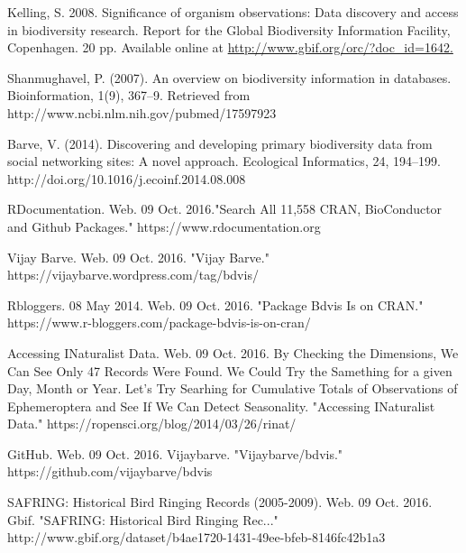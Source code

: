 
\begin{thebibliography}{99}

Kelling, S. 2008. Significance of organism observations: Data discovery and access in biodiversity research. Report for the Global Biodiversity Information Facility, Copenhagen. 20 pp. Available online at \url{http://www.gbif.org/orc/?doc_id=1642.}

Shanmughavel, P. (2007). An overview on biodiversity information in databases. Bioinformation, 1(9), 367–9. Retrieved from http://www.ncbi.nlm.nih.gov/pubmed/17597923

Barve, V. (2014). Discovering and developing primary biodiversity data from social networking sites: A novel approach. Ecological Informatics, 24, 194–199. http://doi.org/10.1016/j.ecoinf.2014.08.008

RDocumentation. Web. 09 Oct. 2016."Search All 11,558 CRAN, BioConductor and Github Packages." https://www.rdocumentation.org

Vijay Barve. Web. 09 Oct. 2016. "Vijay Barve." https://vijaybarve.wordpress.com/tag/bdvis/

Rbloggers. 08 May 2014. Web. 09 Oct. 2016. "Package Bdvis Is on CRAN." https://www.r-bloggers.com/package-bdvis-is-on-cran/

Accessing INaturalist Data. Web. 09 Oct. 2016. By Checking the Dimensions, We Can See Only 47 Records Were Found. We Could Try the Samething for a given Day, Month or Year. Let's Try Searhing for Cumulative Totals of Observations of Ephemeroptera and See If We Can Detect Seasonality. "Accessing INaturalist Data."  https://ropensci.org/blog/2014/03/26/rinat/

GitHub. Web. 09 Oct. 2016. Vijaybarve. "Vijaybarve/bdvis." https://github.com/vijaybarve/bdvis

SAFRING: Historical Bird Ringing Records (2005-2009). Web. 09 Oct. 2016. Gbif. "SAFRING: Historical Bird Ringing Rec..." http://www.gbif.org/dataset/b4ae1720-1431-49ee-bfeb-8146fc42b1a3


\end{thebibliography}
